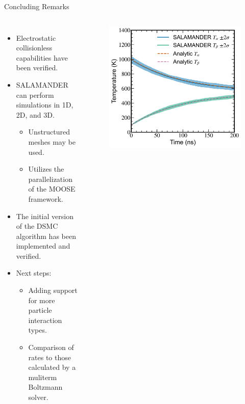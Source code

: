 \begin{frame}{Concluding Remarks}
  \vspace{1cm}
  \begin{columns}
    \begin{itemize}
      \item Electrostatic collisionless capabilities have been verified.
      \item SALAMANDER can perform simulations in 1D, 2D, and 3D.
      \begin{itemize}
        \item Unstructured meshes may be used.
        \item Utilizes the parallelization of the MOOSE framework.
      \end{itemize}
      \item The initial version of the DSMC algorithm has been implemented and verified.
      \item Next steps:
      \begin{itemize}
        \item Adding support for more particle interaction types.
        \item Comparison of rates to those calculated by a muliterm Boltzmann solver.
      \end{itemize}
    \end{itemize}
    \begin{figure}[H]
      \centering
      \includegraphics[width=\textwidth]{figs/theramlization.png}
    \end{figure}
  \end{columns}
\end{frame}
